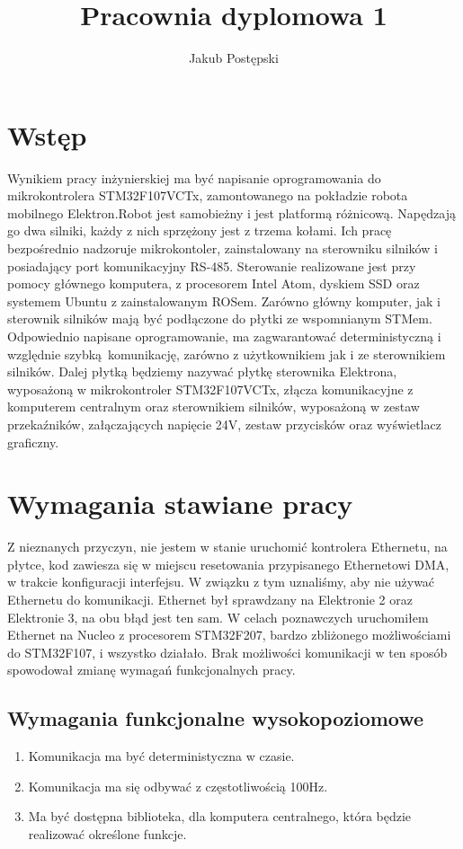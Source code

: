 \documentclass[10pt,a4paper]{article}
\author{Jakub Postępski}
\title{Pracownia dyplomowa 1}
\begin{document}
	\maketitle
	\section{Wstęp}
	Wynikiem pracy inżynierskiej ma być napisanie oprogramowania do mikrokontrolera STM32F107VCTx, zamontowanego na pokładzie robota mobilnego Elektron.\newline Robot jest samobieżny i jest platformą różnicową. Napędzają go dwa silniki, każdy z nich sprzężony jest z trzema kołami. Ich pracę bezpośrednio nadzoruje mikrokontoler, zainstalowany na sterowniku silników i posiadający port komunikacyjny RS-485. Sterowanie realizowane jest przy pomocy głównego komputera, z procesorem Intel Atom, dyskiem SSD oraz systemem Ubuntu z zainstalowanym ROSem. Zarówno główny komputer, jak i sterownik silników mają być podłączone do płytki ze wspomnianym STMem. Odpowiednio napisane oprogramowanie, ma zagwarantować deterministyczną i względnie szybką komunikację, zarówno z użytkownikiem jak i ze sterownikiem silników.\newline
	Dalej płytką będziemy nazywać płytkę sterownika Elektrona, wyposażoną w mikrokontroler STM32F107VCTx, złącza komunikacyjne z komputerem centralnym oraz sterownikiem silników, wyposażoną w zestaw przekaźników, załączających napięcie 24V, zestaw przycisków oraz wyświetlacz graficzny.
	\section{Wymagania stawiane pracy}
	Z nieznanych przyczyn, nie jestem w stanie uruchomić kontrolera Ethernetu, na płytce, kod zawiesza się w miejscu resetowania przypisanego Ethernetowi DMA, w trakcie konfiguracji interfejsu. W związku z tym uznaliśmy, aby nie używać Ethernetu do komunikacji. Ethernet był sprawdzany na Elektronie 2 oraz Elektronie 3, na obu błąd jest ten sam. W celach poznawczych uruchomiłem Ethernet na Nucleo z procesorem STM32F207, bardzo zbliżonego możliwościami do STM32F107, i wszystko działało. Brak możliwości komunikacji w ten sposób spowodował zmianę wymagań funkcjonalnych pracy.
	\subsection{Wymagania funkcjonalne wysokopoziomowe}
	\begin{enumerate}
		\item Komunikacja ma być deterministyczna w czasie.
		\item Komunikacja ma się odbywać z częstotliwością 100Hz.
		\item Ma być dostępna biblioteka, dla komputera centralnego, która będzie realizować określone funkcje.
	\end{enumerate}
\end{document}
